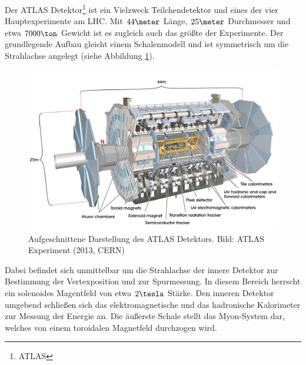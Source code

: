 
Der ATLAS Detektor\footnote{\acf{ATLAS}} ist ein Vielzweck Teilchendetektor und
eines der vier Hauptexperimente am \ac{LHC}. Mit $44\meter$ Länge, $25\meter$
Durchmesser und etwa $7000\ton$ Gewicht ist es zugleich auch das größte der
Experimente. Der grundlegende Aufbau gleicht einem Schalenmodell und ist
symmetrisch um die Strahlachse angelegt (siehe Abbildung \ref{fig:atlas}).

\begin{figure}[ht]
    \centering
    \includegraphics[width=1.0\textwidth]{img/atlas}
    \caption[Aufgeschnittene Darstellung des ATLAS Detektors]
        {Aufgeschnittene Darstellung des ATLAS Detektors. Bild: ATLAS
        Experiment (2013, CERN)}
    \label{fig:atlas}
\end{figure}

Dabei befindet sich unmittelbar um die Strahlachse der innere Detektor zur
Bestimmung der Vertexposition und zur Spurmessung. In diesem Bereich herrscht
ein solenoides Magentfeld von etwa $2\tesla$ Stärke. Den inneren Detektor
umgebend schließen sich das elektromagnetische und das hadronische Kalorimeter
zur Messung der Energie an. Die äußerste Schale stellt das Myon-System dar,
welches von einem toroidalen Magnetfeld durchzogen wird.

